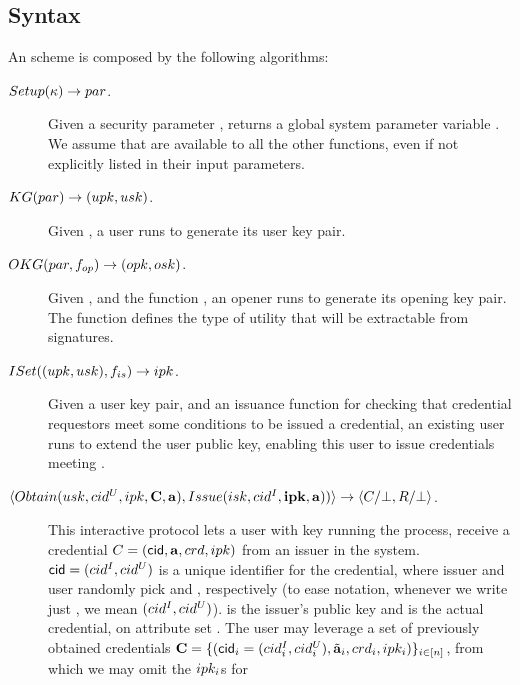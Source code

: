 
\subsection{Syntax}
\label{ssec:syntax-uas}

An \UAS scheme is composed by the following algorithms:

\begin{description}
\item[$Setup(\kappa) \rightarrow par$.] Given a security parameter \secpar,
  returns a global system parameter variable \parm. We assume that \parm are
  available to all the other functions, even if not explicitly listed in their
  input parameters.
\item[$KG(par) \rightarrow (upk,usk)$.] Given \parm, a user runs
  \KeyGen to generate its user key pair. 
\item[$OKG(par,f_{op}) \rightarrow (opk,osk)$.] Given \parm, and the
  function \finsp, an opener runs \OKeyGen to generate its opening key pair.
  The function \finsp defines the type of utility that will be extractable from
  signatures.
\item[$ISet((upk,usk),f_{is}) \rightarrow ipk$.] Given a user key
  pair, and an issuance function \fissue for checking that credential requestors
  meet some conditions to be issued a credential, an existing user runs \ISet to
  extend the user public key, enabling this user to issue credentials meeting
  \fissue.
\item[$\langle
  Obtain(usk,cid^U,ipk,\mathbf{C},\mathbf{a}),
  Issue(isk,cid^I,\mathbf{ipk},\mathbf{a}))  
  \rangle \rightarrow \langle C/\bot,R/\bot
  \rangle$.] %
  This interactive protocol lets a user with key \usk running the \Obtain
  process, receive a credential $C=(\mathsf{cid},\mathbf{a},crd,ipk)$
  from an issuer in the system. $\mathsf{cid}=(cid^I,cid^U)$ is a unique identifier for
  the credential, where issuer and user randomly pick \cidi and \cidu,
  respectively (to ease notation, whenever we write just \cid, we mean $(cid^I,
  cid^U)$). \ipk is the issuer's public key and \cred is the actual credential,
  on attribute set \attrs. The user may leverage a set of previously obtained
  credentials $\mathbf{C}=\lbrace (\mathsf{cid}_i=(cid^I_i,cid^U_i),\tilde{\mathbf{a}}_i,crd_i,
  ipk_i)\rbrace_{i\in[n]}$, from which we may omit the $ipk_i$s for

\end{description}
